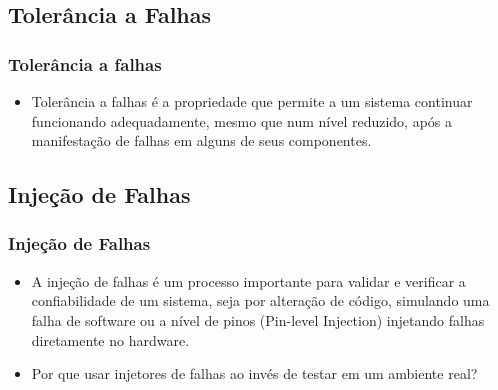 
\subsection{Tolerância a Falhas}

\begin{frame}
	\frametitle{Tolerância a falhas}
	\begin{itemize}
		\item Tolerância a falhas é a propriedade que permite a um sistema continuar funcionando adequadamente, mesmo que num nível reduzido, após a manifestação de falhas em alguns de seus componentes.
	\end{itemize}
\end{frame}

\subsection{Injeção de Falhas}

\begin{frame}
	\frametitle{Injeção de Falhas}
	\begin{itemize}
		\item A injeção de falhas é um processo importante para validar e verificar a confiabilidade de um sistema, seja por alteração de código, simulando uma falha de software ou a nível de pinos (Pin-level Injection) injetando falhas diretamente no hardware.
		\item Por que usar injetores de falhas ao invés de testar em um ambiente real?
	\end{itemize}
\end{frame}

